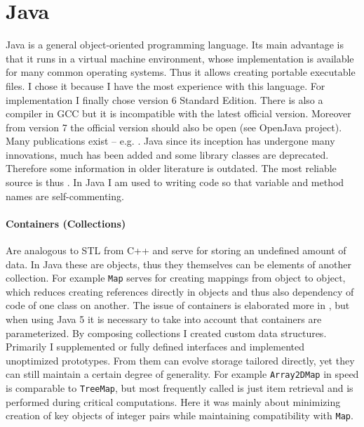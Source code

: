 \documentclass[english]{cls/fitthesis}
\newcommand{\cfr}[1]{\texttt{#1}}
\newcommand{\sourceRef}[1]{\cfr{#1}}
\begin{document}
  \section{Java} \label{java}
  Java is a general object-oriented programming language.
  Its main advantage is that it runs in a virtual machine environment, whose implementation
  is available for many common operating systems. Thus it allows creating portable
  executable files.
  I chose it because I have the most experience with this language.
  For implementation I finally chose version 6 Standard Edition.
  There is also a compiler in GCC but it is incompatible with the latest official version.
  Moreover from version 7 the official version should also be open (see OpenJava project).
  Many publications exist -- e.g. \cite{pecinovskyJ5u, spellProfJava}.
  Java since its inception has undergone many innovations, much has been added and some library classes
  are deprecated. Therefore some information in older literature is outdated.
  The most reliable source is thus \cite{javaapidoc}.
  In Java I am used to writing code so that variable and method names are self-commenting.

    \paragraph{Containers (Collections)} Are analogous to STL from C++ and serve for storing an undefined amount of data. In Java these are objects, thus they themselves can be elements of another collection.
    For example \sourceRef{Map} serves for creating mappings from object to object, which reduces
    creating references directly in objects and thus also dependency of code of one class on another.
    The issue of containers is elaborated more in \cite{heroutUtil}, but when using Java 5 it is
    necessary to take into account that containers are parameterized.
    By composing collections I created custom data structures. Primarily I supplemented or fully
    defined interfaces and implemented unoptimized prototypes. From them can evolve storage
    tailored directly, yet they can still maintain a certain degree of generality. For example \sourceRef{Array2DMap}
    in speed is comparable to \sourceRef{TreeMap}, but
    most frequently called is just item retrieval and is performed during critical computations.
    Here it was mainly about minimizing creation of key objects of integer pairs while maintaining
    compatibility with \sourceRef{Map}.
\end{document}
